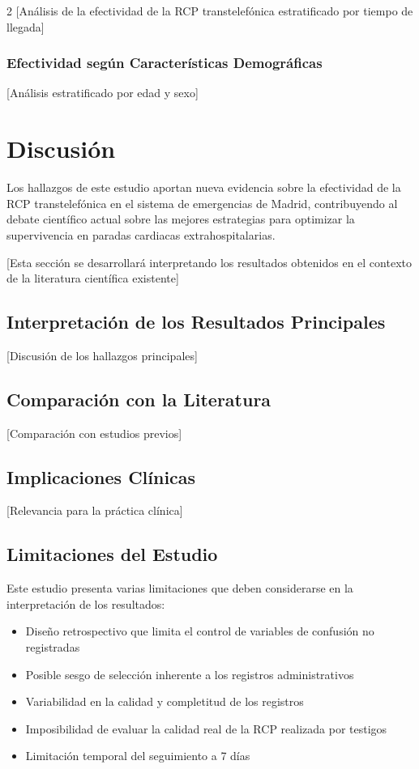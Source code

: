 \documentclass[10pt,a4paper]{article}
\begin{document}
\begin{multicols}{2}
[Análisis de la efectividad de la RCP transtelefónica estratificado por tiempo de llegada]

\subsubsection{Efectividad según Características Demográficas}

[Análisis estratificado por edad y sexo]

\section{Discusión}

Los hallazgos de este estudio aportan nueva evidencia sobre la efectividad de la RCP transtelefónica en el sistema de emergencias de Madrid, contribuyendo al debate científico actual sobre las mejores estrategias para optimizar la supervivencia en paradas cardiacas extrahospitalarias.

[Esta sección se desarrollará interpretando los resultados obtenidos en el contexto de la literatura científica existente]

\subsection{Interpretación de los Resultados Principales}

[Discusión de los hallazgos principales]

\subsection{Comparación con la Literatura}

[Comparación con estudios previos]

\subsection{Implicaciones Clínicas}

[Relevancia para la práctica clínica]

\subsection{Limitaciones del Estudio}

Este estudio presenta varias limitaciones que deben considerarse en la interpretación de los resultados:

\begin{itemize}
\item Diseño retrospectivo que limita el control de variables de confusión no registradas
\item Posible sesgo de selección inherente a los registros administrativos
\item Variabilidad en la calidad y completitud de los registros
\item Imposibilidad de evaluar la calidad real de la RCP realizada por testigos
\item Limitación temporal del seguimiento a 7 días
\end{itemize}


\end{multicols}
\end{document}

